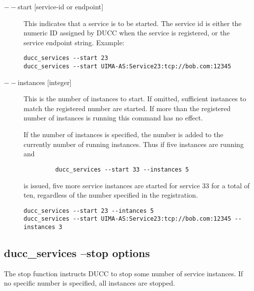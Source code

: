        \begin{description}
       \item[$--$start {[service-id or endpoint]}] This indicates that a service is to be started. The service id
         is either the numeric ID assigned by DUCC when the service is registered, or the service
         endpoint string.  Example:
\begin{verbatim}
ducc_services --start 23 
ducc_services --start UIMA-AS:Service23:tcp://bob.com:12345 
\end{verbatim}
         
       \item[$--$instances {[integer]}] This is the number of instances to start. If omitted, sufficient
         instances to match the registered number are started. If more than the registered number of
         instances is running this command has no effect.

         If the number of instances is specified, the number is added
         to the currently number of running instances. Thus if five instances are running and
\begin{verbatim}
         ducc_services --start 33 --instances 5
\end{verbatim}
         is issued, five more service instances are started for service 33 for a total of ten,
         regardless of the number specified in the registration. 
\begin{verbatim}
ducc_services --start 23 --intances 5 
ducc_services --start UIMA-AS:Service23:tcp://bob.com:12345 --instances 3 
\end{verbatim}

       \end{description}

    \subsection{ducc\_services --stop options}
    The stop function instructs DUCC to stop some number of service instances. If no specific number
    is specified, all instances are stopped.

